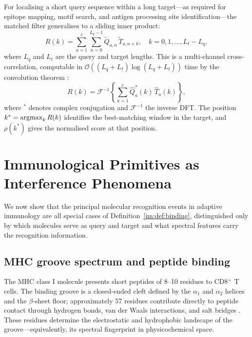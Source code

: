 For localising a short query sequence within a long target---as required for
epitope mapping, motif search, and antigen processing site identification---the
matched filter generalises to a sliding inner product:
\begin{equation}
  R(k) = \sum_{a=1}^{c}\sum_{n=0}^{L_q-1}
    \widetilde{Q}_{a,n}\,\widetilde{T}_{a,n+k},
  \quad k = 0, 1, \ldots, L_t - L_q,
  \label{im:eq:sliding_filter}
\end{equation}
where $L_q$ and $L_t$ are the query and target lengths. This is a
multi-channel cross-correlation, computable in
$\mathcal{O}((L_q+L_t)\log(L_q+L_t))$ time by the convolution theorem
\citep{oppenheim2009}:
\begin{equation}
  R(k) = \mathcal{F}^{-1}\!\left\{
    \sum_{a=1}^{c} \widehat{Q}_{a}^*(k)\,\widehat{T}_{a}(k)
  \right\},
  \label{im:eq:cross_correlation_fft}
\end{equation}
where ${}^*$ denotes complex conjugation and $\mathcal{F}^{-1}$ the inverse
DFT. The position $k^* = \operatorname*{argmax}_k R(k)$ identifies the best-matching window
in the target, and $\rho(k^*)$ gives the normalised score at that position.

\section{Immunological Primitives as Interference Phenomena}
\label{im:sec:immunological_primitives}

We now show that the principal molecular recognition events in adaptive
immunology are all special cases of Definition~\ref{im:def:binding},
distinguished only by which molecules serve as query and target and what
spectral features carry the recognition information.

\subsection{MHC groove spectrum and peptide binding}
\label{im:sec:mhc_binding}

The MHC class I molecule presents short peptides of 8--10 residues to
CD8$^+$ T cells. The binding groove is a closed-ended cleft defined by the
$\alpha_1$ and $\alpha_2$ helices and the $\beta$-sheet floor; approximately
57 residues contribute directly to peptide contact through hydrogen bonds,
van der Waals interactions, and salt bridges \citep{bjorkman1987}. These
residues determine the electrostatic and hydrophobic landscape of the
groove---equivalently, its spectral fingerprint in physicochemical space.

